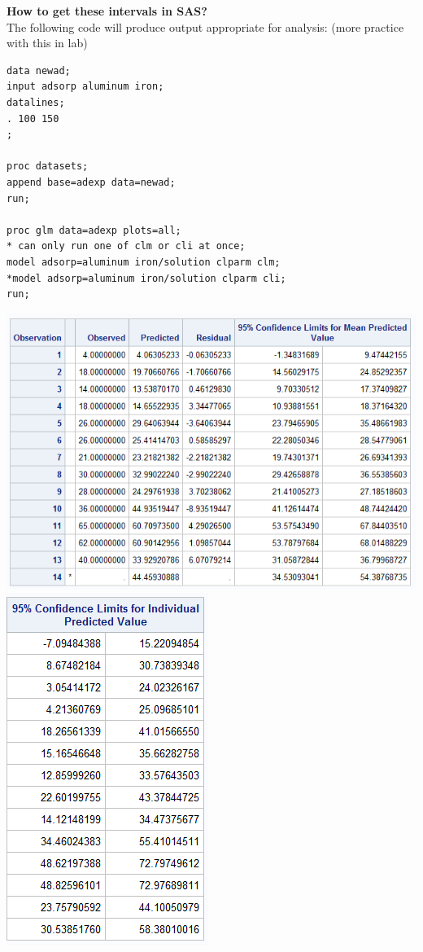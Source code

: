 \newpage

\Large\textbf{How to get these intervals in SAS?}\large\\
The following code will produce output appropriate for analysis: (more practice with this in lab)
\begin{small}
\begin{verbatim}
data newad;
input adsorp aluminum iron;
datalines;
. 100 150
;

proc datasets;
append base=adexp data=newad;
run;

proc glm data=adexp plots=all;
* can only run one of clm or cli at once;
model adsorp=aluminum iron/solution clparm clm;
*model adsorp=aluminum iron/solution clparm cli;
run;
\end{verbatim}
\end{small}

\begin{flushleft}
\includegraphics[scale=0.7]{adsorptionCIPI}\includegraphics[scale=0.7]{adsorptionPI}\\
\end{flushleft}

